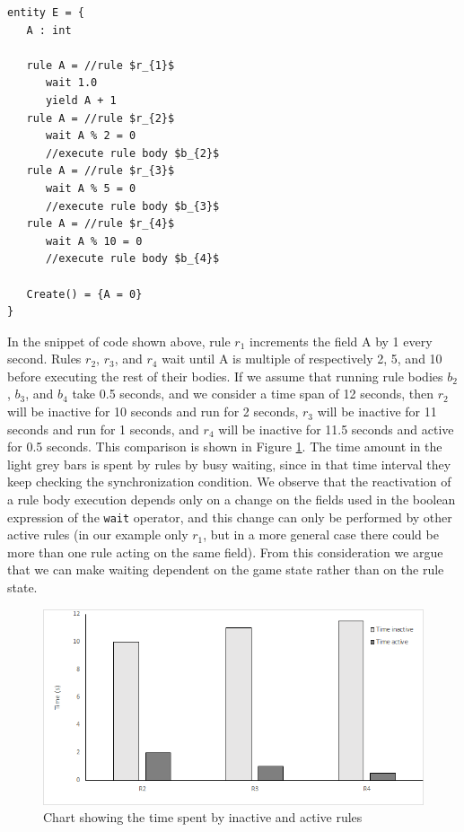 \begin{lstlisting}[mathescape]
entity E = {
   A : int
	
   rule A = //rule $r_{1}$
      wait 1.0
      yield A + 1
   rule A = //rule $r_{2}$
      wait A % 2 = 0
      //execute rule body $b_{2}$
   rule A = //rule $r_{3}$
      wait A % 5 = 0
      //execute rule body $b_{3}$
   rule A = //rule $r_{4}$
      wait A % 10 = 0
      //execute rule body $b_{4}$
      
   Create() = {A = 0}		
}
\end{lstlisting}
In the snippet of code shown above, rule $r_{1}$ increments the field A by 1 every second. Rules $r_{2}$, $r_{3}$, and $r_{4}$ wait until A is multiple of respectively 2, 5, and 10 before executing the rest of their bodies. If we assume that running rule bodies $b_{2}$, $b_{3}$, and $b_{4}$ take 0.5 seconds, and we consider a time span of 12 seconds, then $r_{2}$ will be inactive for 10 seconds and run for 2 seconds, $r_{3}$ will be inactive for 11 seconds and run for 1 seconds, and $r_{4}$ will be inactive for 11.5 seconds and active for 0.5 seconds. This comparison is shown in Figure \ref{fig:s4f1}. The time amount in the light grey bars is spent by rules by busy waiting, since in that time interval they keep checking the synchronization condition. We observe that the reactivation of a rule body execution depends only on a change on the fields used in the boolean expression of the \texttt{wait} operator, and this change can only be performed by other active rules (in our example only $r_{1}$, but in a more general case there could be more than one rule acting on the same field). From this consideration we argue that we can make waiting dependent on the game state rather than on the rule state.

\begin{figure}
	\centering
	\includegraphics[scale=0.5]{Image/wait_chart}
	\caption{Chart showing the time spent by inactive and active rules}
	\label{fig:s4f1}
\end{figure}


